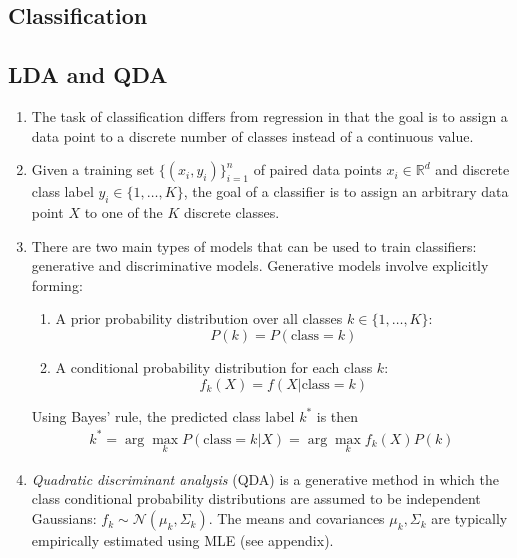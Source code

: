 \documentclass[10pt]{article}
\begin{document}
\begin{multicols}{2}
\section{Classification}

\begin{addmargin}[0.8em]{0.5em}
    \subsection{LDA and QDA}
    \begin{enumerate}[label=(\alph*)]
        \item The task of classification differs from regression in that the goal is to assign a data point to a discrete number of classes instead of a continuous value.
        
        \item Given a training set $\{ (x_i, y_i) \}_{i=1}^{n}$ of paired data points $x_i \in \mathbb{R}^d$ and discrete class label $y_i \in \{ 1, \hdots, K \}$, the goal of a classifier is to assign an arbitrary data point $X$ to one of the $K$ discrete classes.
        
        \item There are two main types of models that can be used to train classifiers: generative and discriminative models. Generative models involve explicitly forming:
        \begin{enumerate}[1.]
            \item A prior probability distribution over all classes $k \in \{ 1, \hdots, K \}$:
            $$
            P(k) = P(\text{class} = k)
            $$
            \item A conditional probability distribution for each class $k$:
            $$
            f_k(X) = f(X | \text{class}= k)
            $$
        \end{enumerate}
        Using Bayes' rule, the predicted class label $k^*$ is then
        \begin{align*}
            k^* = \arg\max_{k} P(\text{class}=k | X) = \arg\max_{k} f_k(X) P(k)
        \end{align*}
        
        \item \textit{Quadratic discriminant analysis} (QDA) is a generative method in which the class conditional probability distributions are assumed to be independent Gaussians: $f_k \sim \mathcal{N}(\mu_k, \Sigma_k)$. The means and covariances $\mu_k, \Sigma_k$ are typically empirically estimated using MLE (see appendix).
        

\end{enumerate}
\end{addmargin}
\end{multicols}
\end{document}
